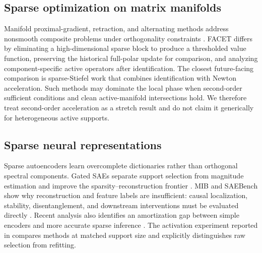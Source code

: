 \subsection{Sparse optimization on matrix manifolds}
Manifold proximal-gradient, retraction, and alternating methods address nonsmooth composite problems under orthogonality constraints \citep{absil2008optimization}. FACET differs by eliminating a high-dimensional sparse block to produce a thresholded value function, preserving the historical full-polar update for comparison, and analyzing component-specific active operators after identification. The closest future-facing comparison is sparse-Stiefel work that combines identification with Newton acceleration. Such methods may dominate the local phase when second-order sufficient conditions and clean active-manifold intersections hold. We therefore treat second-order acceleration as a stretch result and do not claim it generically for heterogeneous active supports.

\subsection{Sparse neural representations}
Sparse autoencoders learn overcomplete dictionaries rather than orthogonal spectral components. Gated SAEs separate support selection from magnitude estimation and improve the sparsity--reconstruction frontier \citep{rajamanoharan2024gated}. MIB and SAEBench show why reconstruction and feature labels are insufficient: causal localization, stability, disentanglement, and downstream interventions must be evaluated directly \citep{mueller2025mib,karvonen2025saebench}. Recent analysis also identifies an amortization gap between simple encoders and more accurate sparse inference \citep{oneill2025compute}. The activation experiment reported in  compares methods at matched support size and explicitly distinguishes raw selection from refitting.


